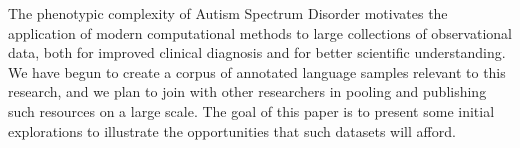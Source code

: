 The phenotypic complexity of Autism Spectrum Disorder motivates the application of modern computational methods to large collections of observational data, both for improved clinical diagnosis and for better scientific understanding. We have begun to create a corpus of annotated language samples relevant to this research, and we plan to join with other researchers in pooling and publishing such resources on a large scale. The goal of this paper is to present some initial explorations to illustrate the opportunities that such datasets will afford.
